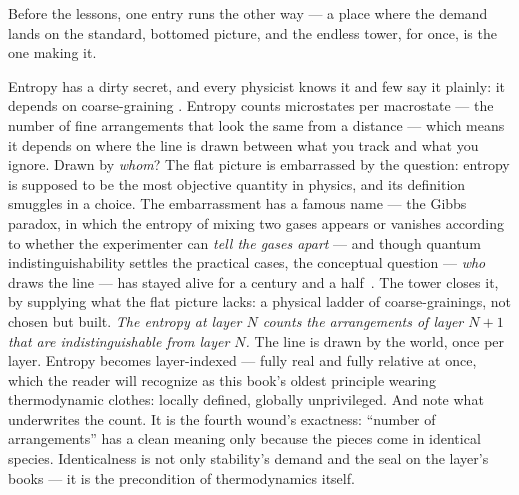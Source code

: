 \documentclass[fontsize=11pt,paper=a4,pagesize=auto,parskip=half-]{scrbook}
\newcommand{\Ixtmp}{}
\DeclareRobustCommand{\Ix}[1]{%
  #1%
  \begingroup
    \lowercase{\gdef\Ixtmp{#1}}%
    \expandafter\index\expandafter{\Ixtmp}%
  \endgroup}
\newcommand{\Iy}[1]{#1\index{#1}}
\begin{document}
Before the lessons, one entry runs the other way --- a place where the demand lands on the standard, bottomed picture, and the endless tower, for once, is the one making it.

\Ix{Entropy} has a dirty secret, and every physicist knows it and few say it plainly: it depends on \Ix{coarse-graining}. Entropy counts microstates per macrostate --- the number of fine arrangements that look the same from a distance --- which means it depends on where the line is drawn between what you track and what you ignore. Drawn by \emph{whom}? The flat picture is embarrassed by the question: entropy is supposed to be the most objective quantity in physics, and its definition smuggles in a choice. The embarrassment has a famous name --- the \Iy{Gibbs paradox}, in which the entropy of mixing two gases appears or vanishes according to whether the experimenter can \emph{tell the gases apart} --- and though quantum indistinguishability settles the practical cases, the conceptual question --- \emph{who} draws the line --- has stayed alive for a century and a half~\cite{jaynes1965}. The tower closes it, by supplying what the flat picture lacks: a physical ladder of coarse-grainings, not chosen but built. \emph{The entropy at layer $N$ counts the arrangements of layer $N{+}1$ that are indistinguishable from layer $N$.} The line is drawn by the world, once per layer. Entropy becomes layer-indexed --- fully real and fully relative at once, which the reader will recognize as this book's oldest principle wearing thermodynamic clothes: locally defined, globally unprivileged. And note what underwrites the count. It is the fourth wound's exactness: ``number of arrangements'' has a clean meaning only because the pieces come in identical species. Identicalness is not only stability's demand and the seal on the layer's books --- it is the precondition of thermodynamics itself.
\end{document}

